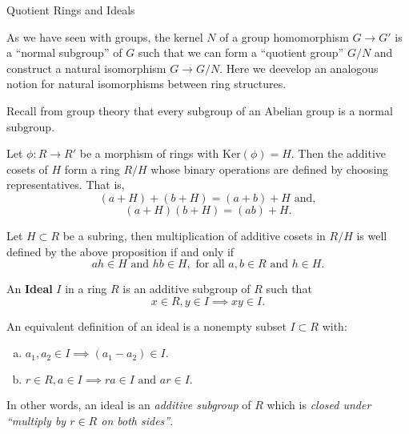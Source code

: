 \begin{section}{Quotient Rings and Ideals}

As we have seen with groups, the kernel $N$ of a group homomorphism $G \to G'$ is a ``normal subgroup'' of $G$ such that we can form a ``quotient group'' $G/N$ and construct a natural isomorphism $G \to G/N$. Here we deevelop an analogous notion for natural isomorphisms between ring structures.

Recall from group theory that every subgroup of an Abelian group is a normal subgroup.

\begin{prop}
Let $\phi \colon R \to R'$ be a morphism of rings with $\textrm{Ker}(\phi) = H$. Then the additive cosets of $H$ form a ring $R/H$ whose binary operations are defined by choosing representatives. That is, 
$$(a + H) + (b + H) = (a + b) + H \textrm{ and},$$
$$(a + H)(b + H) = (ab) + H.$$
\end{prop}

\begin{prop}
Let $H \subset R$ be a subring, then multiplication of additive cosets in $R/H$ is well defined by the above proposition if and only if 
$$ah \in H \textrm{ and } hb \in H, \textrm{ for all } a,b \in R \textrm{ and } h \in H.$$
\end{prop}

\begin{defn}
  An {\bf Ideal} $I$ in a ring $R$ is an additive subgroup of $R$ such that $$x \in R, y \in I \implies xy \in I.$$
\end{defn}

\begin{rmk}
An equivalent definition of an ideal is a nonempty subset $I \subset R$ with:
\begin{enumerate}[(a)]
\item $a_{1},a_{2} \in I \implies (a_{1} - a_{2}) \in I.$
\item $r \in R, a \in I \implies ra \in I \textrm{ and } ar \in I.$ 
\end{enumerate}
In other words, an ideal is an {\em additive subgroup} of $R$ which is {\em closed under ``multiply by $r \in R$ on both sides''}. 
\end{rmk}


\end{section}
